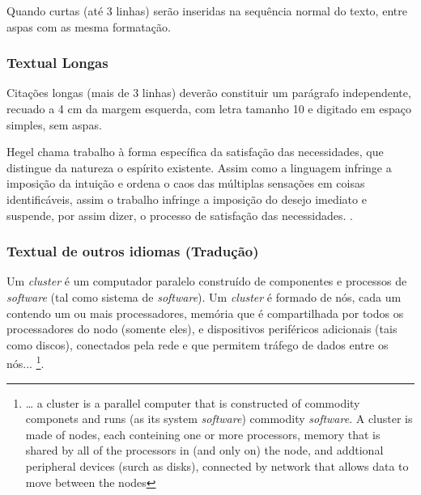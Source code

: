 Quando curtas (até 3 linhas) serão inseridas na sequência normal do texto, entre aspas com as mesma formatação.

\subsubsection{\esp Textual Longas}

Citações longas (mais de 3 linhas) deverão constituir um parágrafo independente, recuado a 4 cm da margem esquerda, 
com letra tamanho 10 e digitado em espaço simples, sem aspas.
\begin{citacaodireta}
Hegel chama trabalho à forma específica da satisfação das necessidades, que
distingue da natureza o espírito existente. Assim como a linguagem infringe
a imposição da intuição e ordena o caos das múltiplas sensações em coisas
identificáveis, assim o trabalho infringe a imposição do \hspace{0.1cm}desejo \hspace{0.1cm}imediato \hspace{0.1cm}e
suspende, por assim dizer, o processo de satisfação das necessidades.
\cite[25]{habermas}.
\end{citacaodireta}



\subsubsection{\esp Textual de outros idiomas (Tradução)}

\begin{citacaodireta} 
Um \textit{cluster} é um computador paralelo construído de componentes e processos de \textit{\textit{software}} (tal como sistema de \textit{\textit{software}}). 
Um \textit{cluster} é formado de nós, cada um contendo um ou mais processadores, memória que é compartilhada por todos os processadores do nodo 
(somente eles), e dispositivos periféricos adicionais (tais como discos), conectados pela rede e que permitem tráfego de dados entre os nós...
\cite[p. 10, tradução nossa]{groupp}\footnote {  … a cluster is a parallel computer that is constructed of commodity  componets and runs 
(as its system \textit{software}) commodity \textit{software}. A cluster is made of nodes, each conteining one or more processors, memory that is  shared 
by all of the processors in (and only on) the node, and addtional peripheral devices (surch as disks),
 connected by network that allows data to move between the nodes}.
\end{citacaodireta}
 
